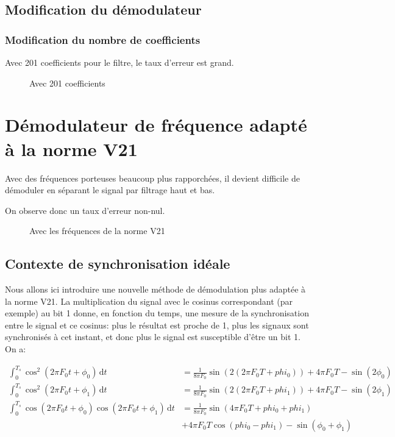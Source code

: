 \documentclass{article}
\begin{document}
\subsection{Modification du démodulateur} 

\subsubsection{Modification du nombre de coefficients}

Avec 201 coefficients pour le filtre, le taux d'erreur est grand.

\begin{figure}[H]
	\centering
	
	\caption{Avec 201 coefficients}
	\label{fig:201-coefficients}
\end{figure}

\section{Démodulateur de fréquence adapté à la norme V21}

Avec des fréquences porteuses beaucoup plus rapporchées, il devient difficile de démoduler en séparant le signal par filtrage haut et bas.

On observe donc un taux d'erreur non-nul.

\begin{figure}[H]
	\centering
	
	\caption{Avec les fréquences de la norme V21}
	\label{fig:filtrage-avec-v21}
\end{figure}

\subsection{Contexte de synchronisation idéale}
\label{synchro-ideale}

Nous allons ici introduire une nouvelle méthode de démodulation plus adaptée à la norme V21.
La multiplication du signal avec le cosinus correspondant (par exemple) au bit 1 donne, en fonction du temps, une mesure de la synchronisation entre le signal et ce cosinus: plus le résultat est proche de 1, plus les signaux sont synchronisés à cet instant, et donc plus le signal est susceptible d'être un bit 1.
On a:

\begin{align*}
	\int_{0}^{T_s} \cos^2(2 \pi F_0 t + \phi_0) \, \mathrm{d}t  &= \frac{1} {8 \pi F_0} \sin(2(2 \pi F_0 T + phi_0))+4 \pi F_0 T - \sin(2 \phi_0) \\
	\int_{0}^{T_s} \cos^2(2 \pi F_0 t + \phi_1) \, \mathrm{d}t  &= \frac{1} {8 \pi F_0} \sin(2(2 \pi F_0 T + phi_1))+4 \pi F_0 T - \sin(2 \phi_1) \\
	\int_{0}^{T_s} \cos(2 \pi F_0 t + \phi_0) \cos(2 \pi F_0 t + \phi_1)\, \mathrm{d}t  &= \frac{1} {8 \pi F_0} \sin(4 \pi F_0 T + phi_0 + phi_1)\\
											    & + 4 \pi F_0 T \cos(phi_0 - phi_1) - \sin (\phi_0 + \phi_1) 
\end{align*}
\end{document}
